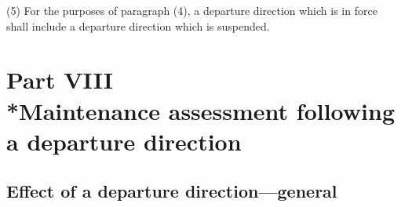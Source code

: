 \documentclass[a4paper]{article}
\newcommand{\parthead}{}
\begin{document}
(5) For the purposes of paragraph (4), a departure direction which is in force
shall include a departure direction which is suspended.

\section[Part VIII --- Maintenance assessment following a departure direction]{Part VIII\\*Maintenance assessment following a departure direction}

\renewcommand\parthead{--- Part VIII}

\subsection[36. Effect of a
departure direction—general]{Effect of a
departure direction—general}
\end{document}
